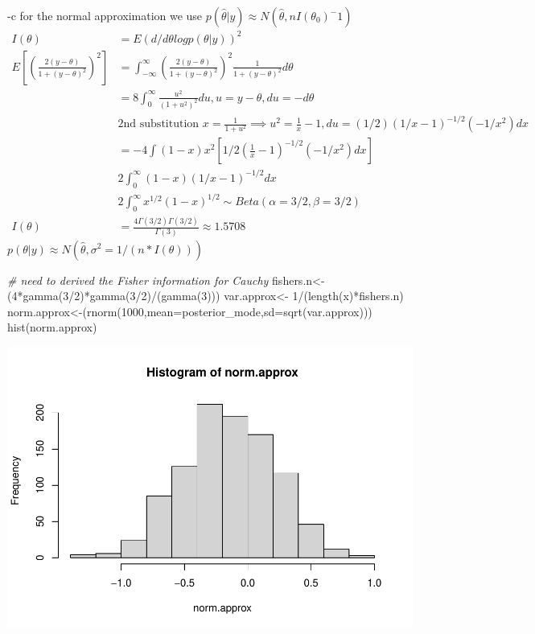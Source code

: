 \documentclass[
]{book}
\newenvironment{Shaded}{\begin{snugshade}}{\end{snugshade}}
\newcommand{\AttributeTok}[1]{\textcolor[rgb]{0.77,0.63,0.00}{#1}}
\newcommand{\CommentTok}[1]{\textcolor[rgb]{0.56,0.35,0.01}{\textit{#1}}}
\newcommand{\DecValTok}[1]{\textcolor[rgb]{0.00,0.00,0.81}{#1}}
\newcommand{\FunctionTok}[1]{\textcolor[rgb]{0.00,0.00,0.00}{#1}}
\newcommand{\NormalTok}[1]{#1}
\newcommand{\OtherTok}[1]{\textcolor[rgb]{0.56,0.35,0.01}{#1}}
\newcommand{\SpecialCharTok}[1]{\textcolor[rgb]{0.00,0.00,0.00}{#1}}
\theoremstyle{definition}
\theoremstyle{definition}
\theoremstyle{definition}
\theoremstyle{definition}
\theoremstyle{remark}
\begin{document}
-c for the normal approximation we use \(p(\hat{\theta}|y)\approx N(\hat{\theta}, nI(\theta_0)^-1)\)
\[
\begin{aligned}
I(\theta) &= E(d/d\theta log p(\theta|y))^2 \\
 E[ (\frac{2(y-\theta)}{1+(y-\theta)^2})^2] &= \int_{-\infty}^{\infty}(\frac{2(y-\theta)}{1+(y-\theta)^2})^2 \frac{1}{1+(y-\theta)^2}d\theta\\
 &= 8 \int_{0}^{\infty} \frac{u^2}{(1+u^2)^2}du,  u= y-\theta,  du = -d\theta\\
& \text{2nd substitution  } x=\frac{1}{1+u^2} \implies u^2=\frac{1}{x}-1 , du=(1/2)(1/x-1)^{-1/2}(-1/x^2)dx\\
 & = -4 \int (1-x)x^2 [1/2 (\frac{1}{x}-1)^{-1/2}(-1/x^2) dx] \\
 &2 \int_0^\infty (1-x) (1/x -1)^{-1/2} dx \\
 & 2 \int_0^\infty x^{1/2}(1-x)^{1/2} \sim Beta(\alpha=3/2, \beta = 3/2)\\
 I(\theta)& = \frac{ 4 \Gamma(3/2)\Gamma(3/2)}{\Gamma(3)} \approx 1.5708
\end{aligned}
\]
\(p(\theta| y) \approx N(\hat{\theta}, \sigma^2 = 1/(n*I(\theta)))\)

\begin{Shaded}
\begin{Highlighting}[]
\CommentTok{\# need to derived the Fisher information for Cauchy}
\NormalTok{   fishers.n}\OtherTok{\textless{}{-}}\NormalTok{(}\DecValTok{4}\SpecialCharTok{*}\FunctionTok{gamma}\NormalTok{(}\DecValTok{3}\SpecialCharTok{/}\DecValTok{2}\NormalTok{)}\SpecialCharTok{*}\FunctionTok{gamma}\NormalTok{(}\DecValTok{3}\SpecialCharTok{/}\DecValTok{2}\NormalTok{)}\SpecialCharTok{/}\NormalTok{(}\FunctionTok{gamma}\NormalTok{(}\DecValTok{3}\NormalTok{)))}
\NormalTok{   var.approx}\OtherTok{\textless{}{-}} \DecValTok{1}\SpecialCharTok{/}\NormalTok{(}\FunctionTok{length}\NormalTok{(x)}\SpecialCharTok{*}\NormalTok{fishers.n)}
\NormalTok{ norm.approx}\OtherTok{\textless{}{-}}\NormalTok{(}\FunctionTok{rnorm}\NormalTok{(}\DecValTok{1000}\NormalTok{,}\AttributeTok{mean=}\NormalTok{posterior\_mode,}\AttributeTok{sd=}\FunctionTok{sqrt}\NormalTok{(var.approx)))}
 \FunctionTok{hist}\NormalTok{(norm.approx)}
\end{Highlighting}
\end{Shaded}

\includegraphics{_main_files/figure-latex/unnamed-chunk-52-1.pdf}
\end{document}
